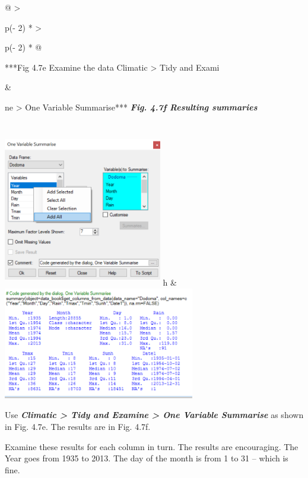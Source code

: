 \documentclass[
  letterpaper,
  DIV=11,
  numbers=noendperiod]{scrreprt}
\begin{document}
\begin{longtable}[]{@{}
  >{\raggedright\arraybackslash}p{(\columnwidth - 2\tabcolsep) * }
  >{\raggedright\arraybackslash}p{(\columnwidth - 2\tabcolsep) * }@{}}
\toprule\noalign{}
\begin{minipage}[b]{\linewidth}\raggedright
***Fig 4.7e Examine the data Climatic \textgreater{} Tidy and Exami
\end{minipage} & \begin{minipage}[b]{\linewidth}\raggedright
ne \textgreater{} One Variable Summarise*** \textbf{\emph{Fig. 4.7f
Resulting summaries}}
\end{minipage} \\
\midrule\noalign{}
\endhead
\bottomrule\noalign{}
\endlastfoot
\includegraphics[width=2.72794in,height=2.68007in]{figures/Fig4.7e.png}
h &
\includegraphics[width=3.288in,height=\textheight]{figures/Fig4.7f.png} \\
\end{longtable}

Use \textbf{\emph{Climatic \textgreater{} Tidy and Examine
\textgreater{} One Variable Summarise}} as shown in Fig. 4.7e. The
results are in Fig. 4.7f.

Examine these results for each column in turn. The results are
encouraging. The Year goes from 1935 to 2013. The day of the month is
from 1 to 31 -- which is fine.
\end{document}
